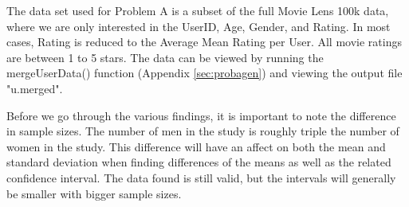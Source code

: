 \documentclass[11pt]{article}  %
\begin{document}
\indent The data set used for Problem A is a subset of the full Movie Lens 100k data, where we are only interested in the UserID, Age, Gender, and Rating. In most cases, Rating is reduced to the Average Mean Rating per User. All movie ratings are between 1 to 5 stars. The data can be viewed by running the mergeUserData() function (Appendix \ref{sec:probagen}) and viewing the output file "u.merged".

\indent Before we go through the various findings, it is important to note the difference in sample sizes. The number of men in the study is roughly triple the number of women in the study. This difference will have an affect on both the mean and standard deviation when finding differences of the means as well as the related confidence interval. The data found is still valid, but the intervals will generally be smaller with bigger sample sizes.
\end{document}
